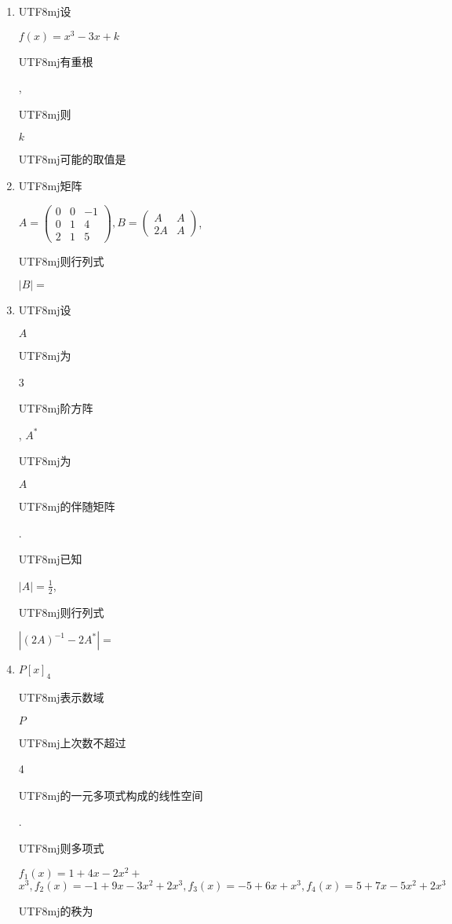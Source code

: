 \documentclass[10pt]{article}
\begin{document}
\begin{enumerate}
  \item \begin{CJK}{UTF8}{mj}设\end{CJK} $f(x)=x^{3}-3 x+k$ \begin{CJK}{UTF8}{mj}有重根\end{CJK}, \begin{CJK}{UTF8}{mj}则\end{CJK} $k$ \begin{CJK}{UTF8}{mj}可能的取值是\end{CJK}

  \item \begin{CJK}{UTF8}{mj}矩阵\end{CJK} $A=\left(\begin{array}{ccc}0 & 0 & -1 \\ 0 & 1 & 4 \\ 2 & 1 & 5\end{array}\right), B=\left(\begin{array}{cc}A & A \\ 2 A & A\end{array}\right)$, \begin{CJK}{UTF8}{mj}则行列式\end{CJK} $|B|=$

  \item \begin{CJK}{UTF8}{mj}设\end{CJK} $A$ \begin{CJK}{UTF8}{mj}为\end{CJK} 3 \begin{CJK}{UTF8}{mj}阶方阵\end{CJK}, $A^{*}$ \begin{CJK}{UTF8}{mj}为\end{CJK} $A$ \begin{CJK}{UTF8}{mj}的伴随矩阵\end{CJK}. \begin{CJK}{UTF8}{mj}已知\end{CJK} $|A|=\frac{1}{2}$, \begin{CJK}{UTF8}{mj}则行列式\end{CJK} $\left|(2 A)^{-1}-2 A^{*}\right|=$

  \item $P[x]_{4}$ \begin{CJK}{UTF8}{mj}表示数域\end{CJK} $P$ \begin{CJK}{UTF8}{mj}上次数不超过\end{CJK} 4 \begin{CJK}{UTF8}{mj}的一元多项式构成的线性空间\end{CJK}. \begin{CJK}{UTF8}{mj}则多项式\end{CJK} $f_{1}(x)=1+4 x-2 x^{2}+$ $x^{3}, f_{2}(x)=-1+9 x-3 x^{2}+2 x^{3}, f_{3}(x)=-5+6 x+x^{3}, f_{4}(x)=5+7 x-5 x^{2}+2 x^{3}$ \begin{CJK}{UTF8}{mj}的秩为\end{CJK}


\end{enumerate}
\end{document}

